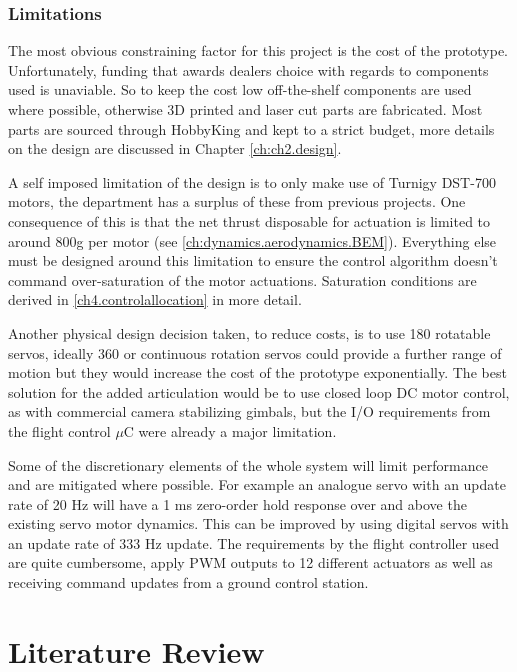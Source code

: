 \subsubsection{Limitations}
\label{subsubsec:ch1.foreward.limits}
The most obvious constraining factor for this project is the cost of the prototype. Unfortunately, funding that  awards dealers choice with regards to components used is unaviable. So to keep the cost low off-the-shelf components are used where possible, otherwise 3D printed and laser cut parts are fabricated. Most parts are sourced through HobbyKing \cite{hobbyking} and kept to a strict budget, more details on the design are discussed in Chapter \ref{ch:ch2.design}.
\par
A self imposed limitation of the design is to only make use of Turnigy DST-700 motors, the department has a surplus of these from previous projects. One consequence of this is that the net thrust disposable for actuation is limited to around 800g per motor (see \ref{ch:dynamics.aerodynamics.BEM}). Everything else must be designed around this limitation to ensure the control algorithm doesn't command over-saturation of the motor actuations. Saturation conditions are derived in \ref{ch4.controlallocation} in more detail.
\par
Another physical design decision taken, to reduce costs, is to use 180 \textdegree rotatable servos, ideally 360 \textdegree or continuous rotation servos could provide a further range of motion but they would increase the cost of the prototype exponentially. The best solution for the added articulation would be to use closed loop DC motor control, as with commercial camera stabilizing gimbals, but the I/O requirements from the flight control $\mu$C were already a major limitation.
\par
Some of the discretionary elements of the whole system will limit performance and are mitigated where possible. For example an analogue servo with an update rate of 20 Hz will have a 1 ms zero-order hold response over and above the existing servo motor dynamics. This can be improved by using digital servos with an update rate of 333 Hz update. The requirements by the flight controller used are quite cumbersome, apply PWM outputs to 12 different actuators as well as receiving command updates from a ground control station. 
\section{Literature Review}
\label{sec:ch1.litreview}
